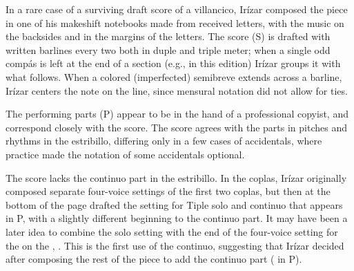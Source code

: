 
\begin{notesources}

\begin{source}
\end{source}

\begin{source}
\end{source}

\end{notesources}

In a rare case of a surviving draft score of a villancico, Irízar composed the piece in one of his makeshift notebooks made from received letters, with the music on the backsides and in the margins of the letters.%
  \autocites{LopezCalo:Segovia}{Olarte:Irizar}
  {LopezCalo:IrizarLetters1}{Rodriguez:Networks}
The score (S) is drafted with written barlines every two  both in duple and triple meter; when a single odd compás is left at the end of a section (e.g.,  in this edition) Irízar groups it with what follows.
When a colored (imperfected) semibreve extends across a barline, Irízar centers the note on the line, since mensural notation did not allow for ties.

The performing parts (P) appear to be in the hand of a professional copyist, and correspond closely with the score.
The score agrees with the parts in pitches and rhythms in the estribillo, differing only in a few cases of accidentals, where  practice made the notation of some accidentals optional.

The score lacks the  continuo part in the estribillo.
In the coplas, Irízar originally composed separate four-voice settings of the first two coplas, but then at the bottom of the page drafted the setting for Tiple solo and continuo that appears in P, with a slightly different beginning to the continuo part.
It may have been a later idea to combine the solo setting with the end of the four-voice setting for the  on the , .
This is the first use of the continuo, suggesting that Irízar decided after composing the rest of the piece to add the continuo part ( in P).

